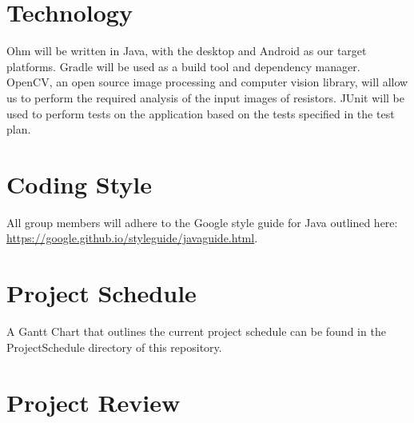 \documentclass[12pt, titlepage]{article}
\begin{document}
\section{Technology}
Ohm will be written in Java, with the desktop and Android as our target platforms. Gradle will be used as a build tool and dependency manager. OpenCV, an open source image processing and computer vision library, will allow us to perform the required analysis of the input images of resistors. JUnit will be used to perform tests on the application based on the tests specified in the test plan.

\section{Coding Style}
All group members will adhere to the Google style guide for Java outlined here: \url{https://google.github.io/styleguide/javaguide.html}.


\section{Project Schedule}
A Gantt Chart that outlines the current project schedule can be found in the ProjectSchedule directory of this repository.

\section{Project Review}
\end{document}
